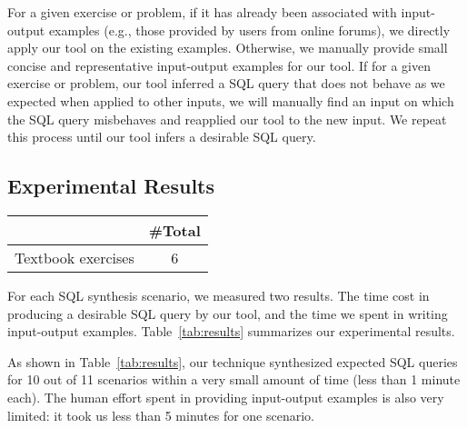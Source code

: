 
For a given exercise or problem, if it
has already been associated with input-output examples (e.g.,
those provided by users from online forums),
we directly apply our tool on the existing examples.
Otherwise, we manually provide small concise and representative
input-output examples for our tool.
If for a given exercise or problem, our tool inferred
a SQL query that does not behave as we expected when applied
to other inputs, we will manually find an input on which the
SQL query misbehaves and reapplied our tool to the new input. We
repeat this process until our tool infers a desirable SQL query.

\subsection{Experimental Results}

\begin{table}[t]
\setlength{\tabcolsep}{.14\tabcolsep}
\begin{tabular}{|c|c|}
\hline
 & \#Total\\
 \hline
 Textbook exercises &  6 \\
\hline
\end{tabular}

\end{table}

For each SQL synthesis scenario, we measured two results.
The time cost in producing
a desirable SQL query by our tool, and
the time we spent in writing input-output examples.
Table~\ref{tab:results} summarizes our experimental results.

As shown in Table~\ref{tab:results}, our technique synthesized
expected SQL queries for 10 out of 11 scenarios
within a very small amount of time (less than 1 minute each).
The human effort spent in providing input-output examples
is also very limited: it took us less than 5 minutes for one scenario.


